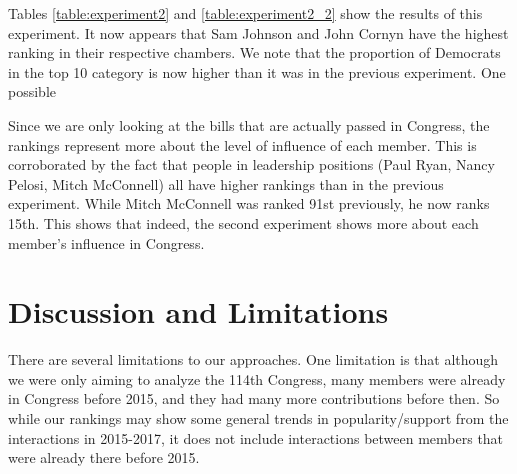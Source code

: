 \documentclass[11pt]{article}
\begin{document}
Tables \ref{table:experiment2} and \ref{table:experiment2_2} show the results of this experiment. It now appears that Sam Johnson and John Cornyn have the highest ranking in their respective chambers. We note that the proportion of Democrats in the top 10 category is now higher than it was in the previous experiment. One possible 
 
 
 
Since we are only looking at the bills that are actually passed in Congress, the rankings represent more about the level of influence of each member. This is corroborated by the fact that people in leadership positions (Paul Ryan, Nancy Pelosi, Mitch McConnell) all have higher rankings than in the previous experiment. While Mitch McConnell was ranked 91st previously, he now ranks 15th. This shows that indeed, the second experiment shows more about each member's influence in Congress. 
 
 
 
 
 
 
 
 
 
 
 
 
 
 
 

\pagebreak















\section*{Discussion and Limitations}
There are several limitations to our approaches. One limitation is that although we were only aiming to analyze the 114th Congress, many members were already in Congress before 2015, and they had many more contributions before then. So while our rankings may show some general trends in popularity/support from the interactions in 2015-2017, it does not include interactions between members that were already there before 2015. 
\end{document}

